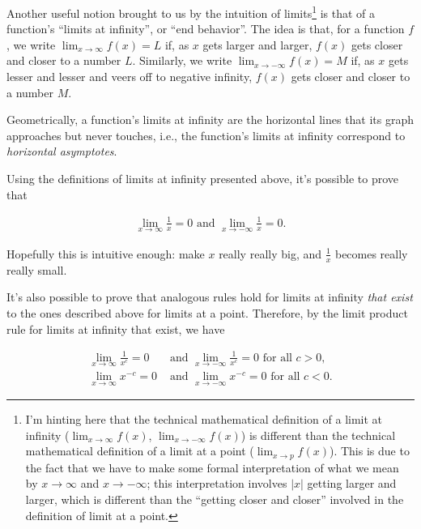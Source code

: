 Another useful notion brought to us by the intuition of limits\footnote{I'm hinting here that the technical mathematical definition of a limit at infinity ($\lim_{x \rightarrow \infty} f(x)$, $\lim_{x \rightarrow -\infty} f(x)$) is different than the technical mathematical definition of a limit at a point ($\lim_{x \rightarrow p} f(x)$). This is due to the fact that we have to make some formal interpretation of what we mean by $x \rightarrow \infty$ and $x \rightarrow -\infty$; this interpretation involves $|x|$ getting larger and larger, which is different than the ``getting closer and closer'' involved in the definition of limit at a point.} is that of a function's ``limits at infinity'', or ``end behavior''. The idea is that, for a function $f$, we write $\lim_{x \rightarrow \infty} f(x) = L$ if, as $x$ gets larger and larger, $f(x)$ gets closer and closer to a number $L$. Similarly, we write $\lim_{x \rightarrow -\infty} f(x) = M$ if, as $x$ gets lesser and lesser and veers off to negative infinity, $f(x)$ gets closer and closer to a number $M$. 

Geometrically, a function's limits at infinity are the horizontal lines that its graph approaches but never touches, i.e., the function's limits at infinity correspond to \textit{horizontal asymptotes}.

Using the definitions of limits at infinity presented above, it's possible to prove that

\begin{align*}
    \lim_{x \rightarrow \infty} \frac{1}{x} = 0 \text{ and } \lim_{x \rightarrow -\infty} \frac{1}{x} = 0. 
\end{align*}

Hopefully this is intuitive enough: make $x$ really really big, and $\frac{1}{x}$ becomes really really small.

It's also possible to prove that analogous rules hold for limits at infinity \textit{that exist} to the ones described above for limits at a point. Therefore, by the limit product rule for limits at infinity that exist, we have

\begin{align*}
    \lim_{x \rightarrow \infty} \frac{1}{x^c} = 0 &\text{ and } \lim_{x \rightarrow -\infty} \frac{1}{x^c} = 0 \text{ for all $c > 0$}, \\
    \lim_{x \rightarrow \infty} x^{-c} = 0 &\text{ and } \lim_{x \rightarrow -\infty} x^{-c} = 0 \text{ for all $c < 0$}.
\end{align*}


